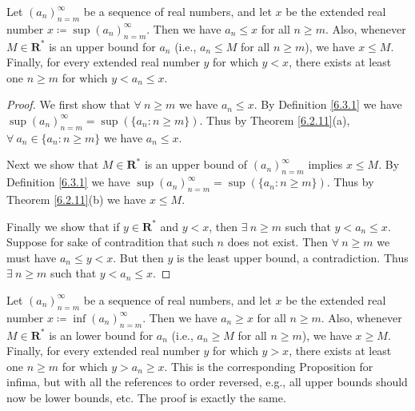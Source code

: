 \setcounter{theorem}{5}
\begin{proposition}\label{6.3.6}
    Let \((a_n)_{n = m}^\infty\) be a sequence of real numbers, and let \(x\) be the extended real number \(x \coloneqq \sup(a_n)_{n = m}^\infty\).
    Then we have \(a_n \leq x\) for all \(n \geq m\).
    Also, whenever \(M \in \mathbf{R}^*\) is an upper bound for \(a_n\) (i.e., \(a_n \leq M\) for all \(n \geq m\)), we have \(x \leq M\).
    Finally, for every extended real number \(y\) for which \(y < x\), there exists at least one \(n \geq m\) for which \(y < a_n \leq x\).
\end{proposition}

\begin{proof}
    We first show that \(\forall\ n \geq m\) we have \(a_n \leq x\).
    By Definition \ref{6.3.1} we have \(\sup(a_n)_{n = m}^\infty = \sup(\{a_n : n \geq m\})\).
    Thus by Theorem \ref{6.2.11}(a), \(\forall\ a_n \in \{a_n : n \geq m\}\) we have \(a_n \leq x\).

    Next we show that \(M \in \mathbf{R}^*\) is an upper bound of \((a_n)_{n = m}^\infty\) implies \(x \leq M\).
    By Definition \ref{6.3.1} we have \(\sup(a_n)_{n = m}^\infty = \sup(\{a_n : n \geq m\})\).
    Thus by Theorem \ref{6.2.11}(b) we have \(x \leq M\).

    Finally we show that if \(y \in \mathbf{R}^*\) and \(y < x\), then \(\exists\ n \geq m\) such that \(y < a_n \leq x\).
    Suppose for sake of contradition that such \(n\) does not exist.
    Then \(\forall\ n \geq m\) we must have \(a_n \leq y < x\).
    But then \(y\) is the least upper bound, a contradiction.
    Thus \(\exists\ n \geq m\) such that \(y < a_n \leq x\).
\end{proof}

\begin{remark}\label{6.3.7}
    Let \((a_n)_{n = m}^\infty\) be a sequence of real numbers, and let \(x\) be the extended real number \(x \coloneqq \inf(a_n)_{n = m}^\infty\).
    Then we have \(a_n \geq x\) for all \(n \geq m\).
    Also, whenever \(M \in \mathbf{R}^*\) is an lower bound for \(a_n\) (i.e., \(a_n \geq M\) for all \(n \geq m\)), we have \(x \geq M\).
    Finally, for every extended real number \(y\) for which \(y > x\), there exists at least one \(n \geq m\) for which \(y > a_n \geq x\).
    This is the corresponding Proposition for infima, but with all the references to order reversed, e.g., all upper bounds should now be lower bounds, etc.
    The proof is exactly the same.
\end{remark}

